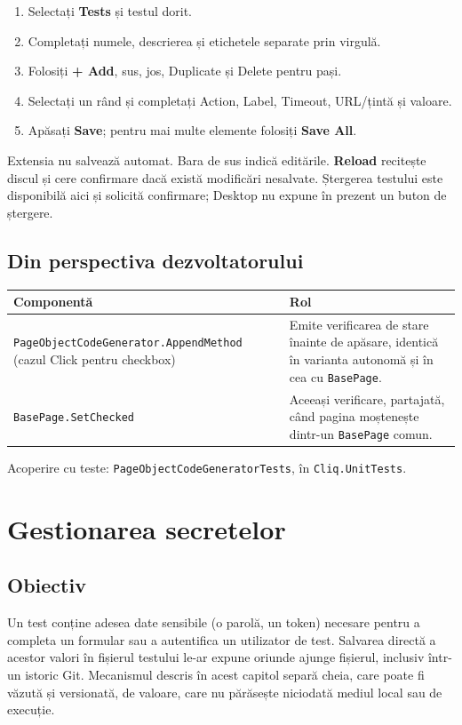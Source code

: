 \documentclass[12pt,a4paper]{report}
\newcommand{\UI}[1]{\textbf{#1}}
\newcommand{\File}[1]{\nolinkurl{#1}}
\begin{document}
\begin{enumerate}
  \item Selectați \UI{Tests} și testul dorit.
  \item Completați numele, descrierea și etichetele separate prin virgulă.
  \item Folosiți \UI{+ Add}, sus, jos, Duplicate și Delete pentru pași.
  \item Selectați un rând și completați Action, Label, Timeout, URL/țintă și valoare.
  \item Apăsați \UI{Save}; pentru mai multe elemente folosiți \UI{Save All}.
\end{enumerate}

Extensia nu salvează automat. Bara de sus indică editările. \UI{Reload} recitește discul și cere confirmare dacă există modificări nesalvate. Ștergerea testului este disponibilă aici și solicită confirmare; Desktop nu expune în prezent un buton de ștergere.

\section{Din perspectiva dezvoltatorului}

\begin{tabularx}{\textwidth}{@{}p{5.3cm}Y@{}}
\toprule \textbf{Componentă} & \textbf{Rol} \\
\midrule
\File{PageObjectCodeGenerator.AppendMethod} (cazul Click pentru checkbox) & Emite verificarea de stare înainte de apăsare, identică în varianta autonomă și în cea cu \File{BasePage}. \\
\File{BasePage.SetChecked} & Aceeași verificare, partajată, când pagina moștenește dintr-un \File{BasePage} comun. \\
\bottomrule
\end{tabularx}

Acoperire cu teste: \File{PageObjectCodeGeneratorTests}, în \File{Cliq.UnitTests}.

\chapter{Gestionarea secretelor}

\section{Obiectiv}

Un test conține adesea date sensibile (o parolă, un token) necesare pentru a completa un formular sau a autentifica un utilizator de test. Salvarea directă a acestor valori în fișierul testului le-ar expune oriunde ajunge fișierul, inclusiv într-un istoric Git. Mecanismul descris în acest capitol separă cheia, care poate fi văzută și versionată, de valoare, care nu părăsește niciodată mediul local sau de execuție.
\end{document}

